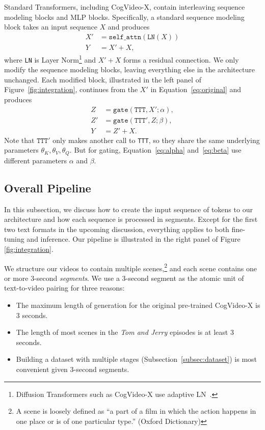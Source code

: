 Standard Transformers, including CogVideo-X, contain interleaving sequence modeling blocks and MLP blocks.
Specifically, a standard sequence modeling block takes an input sequence $X$ and produces
\begin{align}
X' &= \texttt{self\_attn}(\texttt{LN}(X))\label{eq:original}
\\
Y &= X' + X,
\end{align}
where \texttt{LN} is Layer Norm\footnote{Diffusion Transformers such as CogVideo-X use adaptive LN~\cite{peebles2023scalable}.} and $X' + X$ forms a residual connection.
We only modify the sequence modeling blocks, leaving everything else in the architecture unchanged. 
Each modified block, illustrated in the left panel of Figure~\ref{fig:integration}, continues from the $X'$ in Equation~\ref{eq:original} and produces
\begin{align}
Z &= \texttt{gate}(\texttt{TTT}, X'; \alpha),\label{eq:alpha}\\
Z' &= \texttt{gate}(\texttt{TTT}', Z; \beta),\label{eq:beta}\\
Y &= Z' + X.
\label{eq:modified}
\end{align}
Note that $\texttt{TTT}'$ only makes another call to \texttt{TTT}, so they share the same underlying parameters $\theta_K,\theta_V,\theta_Q$.
But for gating, Equation~\ref{eq:alpha} and~\ref{eq:beta} use different parameters $\alpha$ and $\beta$.

\subsection{Overall Pipeline}
\label{subsec:pipeline}
In this subsection, we discuss how to create the input sequence of tokens to our architecture and how each sequence is processed in segments.
Except for the first two text formats in the upcoming discussion, everything applies to both fine-tuning and inference.
Our pipeline is illustrated in the right panel of Figure \ref{fig:integration}.

\label{sec:method:pipeline}
We structure our videos to contain multiple scenes,\footnote{
A scene is loosely defined as ``a part of a film in which the action happens in one place or is of one particular type.'' (Oxford Dictionary) 
} and each scene contains one or more 3-second \emph{segments}.
We use a 3-second segment as the atomic unit of text-to-video pairing for three reasons:
\vspace{0.2em}
\begin{itemize}[itemsep=0.2em]
\item The maximum length of generation for the original pre-trained CogVideo-X is 3 seconds.
\item The length of most scenes in the \textit{Tom and Jerry} episodes is at least 3 seconds.
\item Building a dataset with multiple stages (Subsection~\ref{subsec:dataset}) is most convenient given 3-second segments.
\end{itemize}

